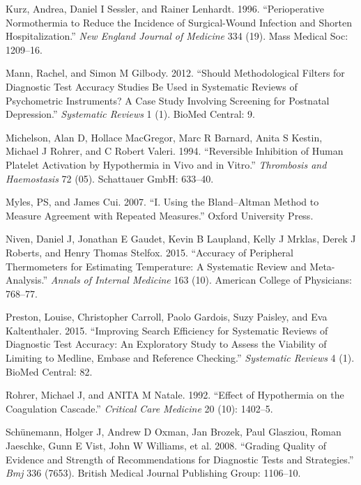 \documentclass[smallextended]{svjour3}       %
\begin{document}
\leavevmode\hypertarget{ref-kurz1996perioperative}{}%
Kurz, Andrea, Daniel I Sessler, and Rainer Lenhardt. 1996.
``Perioperative Normothermia to Reduce the Incidence of Surgical-Wound
Infection and Shorten Hospitalization.'' \emph{New England Journal of
Medicine} 334 (19). Mass Medical Soc: 1209--16.

\leavevmode\hypertarget{ref-mann2012should}{}%
Mann, Rachel, and Simon M Gilbody. 2012. ``Should Methodological Filters
for Diagnostic Test Accuracy Studies Be Used in Systematic Reviews of
Psychometric Instruments? A Case Study Involving Screening for Postnatal
Depression.'' \emph{Systematic Reviews} 1 (1). BioMed Central: 9.

\leavevmode\hypertarget{ref-michelson1994reversible}{}%
Michelson, Alan D, Hollace MacGregor, Marc R Barnard, Anita S Kestin,
Michael J Rohrer, and C Robert Valeri. 1994. ``Reversible Inhibition of
Human Platelet Activation by Hypothermia in Vivo and in Vitro.''
\emph{Thrombosis and Haemostasis} 72 (05). Schattauer GmbH: 633--40.

\leavevmode\hypertarget{ref-myles2007using}{}%
Myles, PS, and James Cui. 2007. ``I. Using the Bland--Altman Method to
Measure Agreement with Repeated Measures.'' Oxford University Press.

\leavevmode\hypertarget{ref-niven2015accuracy}{}%
Niven, Daniel J, Jonathan E Gaudet, Kevin B Laupland, Kelly J Mrklas,
Derek J Roberts, and Henry Thomas Stelfox. 2015. ``Accuracy of
Peripheral Thermometers for Estimating Temperature: A Systematic Review
and Meta-Analysis.'' \emph{Annals of Internal Medicine} 163 (10).
American College of Physicians: 768--77.

\leavevmode\hypertarget{ref-preston2015improving}{}%
Preston, Louise, Christopher Carroll, Paolo Gardois, Suzy Paisley, and
Eva Kaltenthaler. 2015. ``Improving Search Efficiency for Systematic
Reviews of Diagnostic Test Accuracy: An Exploratory Study to Assess the
Viability of Limiting to Medline, Embase and Reference Checking.''
\emph{Systematic Reviews} 4 (1). BioMed Central: 82.

\leavevmode\hypertarget{ref-rohrer1992effect}{}%
Rohrer, Michael J, and ANITA M Natale. 1992. ``Effect of Hypothermia on
the Coagulation Cascade.'' \emph{Critical Care Medicine} 20 (10):
1402--5.

\leavevmode\hypertarget{ref-schunemann2008grading}{}%
Schünemann, Holger J, Andrew D Oxman, Jan Brozek, Paul Glasziou, Roman
Jaeschke, Gunn E Vist, John W Williams, et al. 2008. ``Grading Quality
of Evidence and Strength of Recommendations for Diagnostic Tests and
Strategies.'' \emph{Bmj} 336 (7653). British Medical Journal Publishing
Group: 1106--10.
\end{document}
